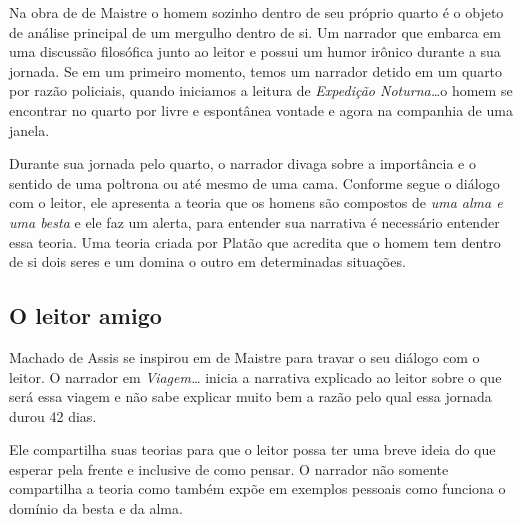 \documentclass[12pt]{extarticle}
\begin{document}




Na obra de de Maistre o homem sozinho dentro de seu próprio quarto é o
objeto de análise principal de um mergulho dentro de si. Um narrador que
embarca em uma discussão filosófica junto ao leitor e possui um humor
irônico durante a sua jornada. Se em um primeiro momento, temos um
narrador detido em um quarto por razão policiais, quando iniciamos a
leitura de \textit{Expedição Noturna\ldots}o homem se encontrar no quarto por livre
e espontânea vontade e agora na companhia de uma janela.

Durante sua jornada pelo quarto, o narrador divaga sobre a importância e
o sentido de uma poltrona ou até mesmo de uma cama. Conforme segue o
diálogo com o leitor, ele apresenta a teoria que os homens são compostos
de \emph{uma alma e uma besta} e ele faz um alerta, para entender sua
narrativa é necessário entender essa teoria. Uma teoria criada por
Platão que acredita que o homem tem dentro de si dois seres e um domina
o outro em determinadas situações.

\subsection{O leitor amigo}

Machado de Assis se inspirou em de Maistre para travar o seu diálogo com
o leitor. O narrador em \emph{Viagem\ldots} inicia a narrativa explicado ao
leitor sobre o que será essa viagem e não sabe explicar muito bem a
razão pelo qual essa jornada durou 42 dias.




Ele compartilha suas teorias para que o leitor possa ter uma breve ideia
do que esperar pela frente e inclusive de como pensar. O narrador não
somente compartilha a teoria como também expõe em exemplos pessoais como
funciona o domínio da besta e da alma.
\end{document}
